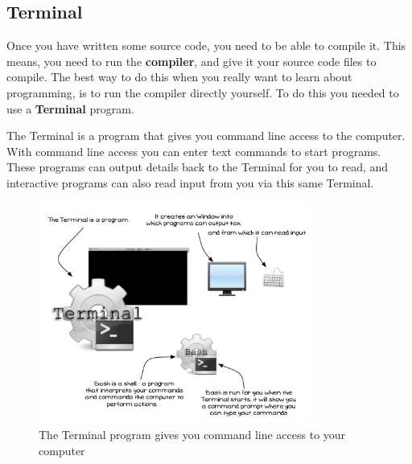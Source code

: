 \clearpage
\subsection{Terminal} %
\label{sub:terminal}

Once you have written some source code, you need to be able to compile it. This means, you need to run the \textbf{compiler}, and give it your source code files to compile. The best way to do this when you really want to learn about programming, is to run the compiler directly yourself. To do this you needed to use a \textbf{Terminal} program.

The Terminal is a program that gives you command line access to the computer. With command line access you can enter text commands to start programs. These programs can output details back to the Terminal for you to read, and interactive programs can also read input from you via this same Terminal.

\begin{figure}[h]
   \centering
   \includegraphics[width=0.8\textwidth]{./topics/programs-and-compilers/diagrams/Terminal} 
   \caption{The Terminal program gives you command line access to your computer}
   \label{fig:terminal}
\end{figure}


